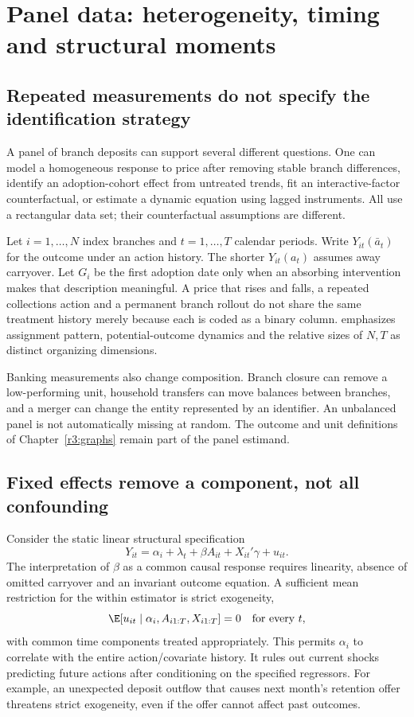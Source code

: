 \chapter{Panel data: heterogeneity, timing and structural moments}
\label{r3:panels}
\section{Repeated measurements do not specify the identification strategy}
A panel of branch deposits can support several different questions.
One can model a homogeneous response to price after removing stable
branch differences, identify an adoption-cohort effect from untreated
trends, fit an interactive-factor counterfactual, or estimate a dynamic
equation using lagged instruments. All use a rectangular data set;
their counterfactual assumptions are different.

Let $i=1,\ldots,N$ index branches and $t=1,\ldots,T$ calendar periods.
Write $Y_{it}(\bar a_t)$ for the outcome under an action history.
The shorter $Y_{it}(a_t)$ assumes away carryover. Let $G_i$ be the
first adoption date only when an absorbing intervention makes that
description meaningful. A price that rises and falls, a repeated
collections action and a permanent branch rollout do not share the
same treatment history merely because each is coded as a binary column.
\citet[Sections 2--4]{panelreview2024} emphasizes assignment pattern,
potential-outcome dynamics and the relative sizes of $N,T$ as distinct
organizing dimensions.

Banking measurements also change composition. Branch closure can remove
a low-performing unit, household transfers can move balances between
branches, and a merger can change the entity represented by an identifier.
An unbalanced panel is not automatically missing at random. The outcome
and unit definitions of Chapter~\ref{r3:graphs} remain part of the
panel estimand.

\section{Fixed effects remove a component, not all confounding}
\label{r3:panel-fe}
Consider the static linear structural specification
\begin{equation}
 Y_{it}=\alpha_i+\lambda_t+\beta A_{it}+X_{it}'\gamma+u_{it}.
 \label{r3:static-panel}
\end{equation}
The interpretation of $\beta$ as a common causal response requires
linearity, absence of omitted carryover and an invariant outcome
equation. A sufficient mean restriction for the within estimator is
strict exogeneity,
\[
 \E[u_{it}\mid \alpha_i,A_{i1:T},X_{i1:T}]=0
 \quad\text{for every }t,
\]
with common time components treated appropriately. This permits
$\alpha_i$ to correlate with the entire action/covariate history.
It rules out current shocks predicting future actions after conditioning
on the specified regressors. For example, an unexpected deposit outflow
that causes next month's retention offer threatens strict exogeneity,
even if the offer cannot affect past outcomes.

